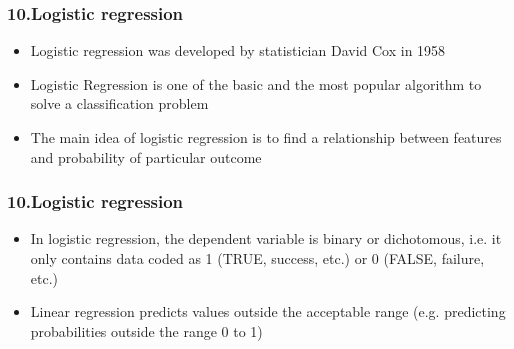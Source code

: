 \documentclass[handout,compress]{beamer} %
\begin{document}
\begin{frame}[allowframebreaks]
\frametitle{10.Logistic regression}
\begin{itemize}
	\item 
	Logistic regression was developed by statistician David Cox in 1958 
	\item 
	Logistic Regression is one of the basic and the most popular algorithm to solve a classification problem
	\item 
	The main idea of logistic regression is to find a relationship between features and probability of particular outcome
\end{itemize}
\end{frame}

\begin{frame}[allowframebreaks]
\frametitle{10.Logistic regression}
\begin{itemize}
	\item 
	In logistic regression, the dependent variable is binary or dichotomous, i.e. it only contains data coded as 1 (TRUE, success, etc.) or 0 (FALSE, failure, etc.)
	\item
	Linear regression predicts values outside the acceptable range (e.g. predicting probabilities
	outside the range 0 to 1)
	
\end{itemize}
\end{frame}
\end{document}
